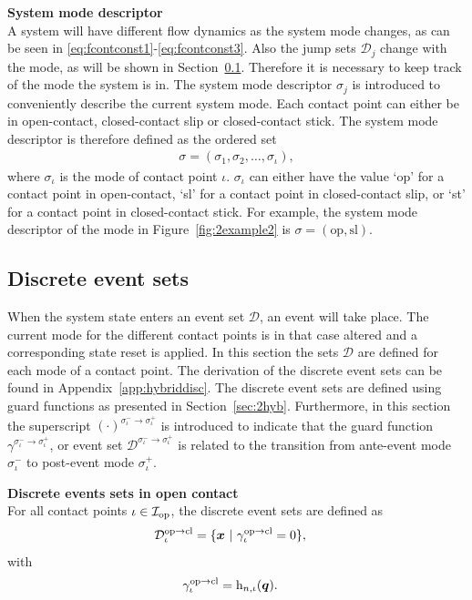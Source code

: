 \documentclass[../DC2017114Bouma.tex]{subfiles}
\begin{document}
\textbf{System mode descriptor}\\
A system will have different flow dynamics as the system mode changes, as can be seen in \eqref{eq:fcontconst1}-\eqref{eq:fcontconst3}. Also the jump sets $\mathcal{D}_j$ change with the mode, as will be shown in Section~\ref{sec:2event}. Therefore it is necessary to keep track of the mode the system is in. The system mode descriptor $\sigma_j$ is introduced to conveniently describe the current system mode. Each contact point can either be in open-contact, closed-contact slip or closed-contact stick. The system mode descriptor is therefore defined as the ordered set
\begin{align}
\sigma = (\sigma_1,\sigma_2,\dots,\sigma_\iota),
\end{align}
where $\sigma_\iota$ is the mode of contact point $\iota$. $\sigma_\iota$ can either have the value `op' for a contact point in open-contact, `sl' for a contact point in closed-contact slip, or `st' for a contact point in closed-contact stick. For example, the system mode descriptor of the mode in Figure~\ref{fig:2example2} is $\sigma = (\text{op},\text{sl})$.

\subsection{Discrete event sets}\label{sec:2event}
When the system state enters an event set $\mathcal{D}$, an event will take place. The current mode for the different contact points is in that case altered and a corresponding state reset is applied. In this section the sets $\mathcal{D}$ are defined for each mode of a contact point. The derivation of the discrete event sets can be found in Appendix~\ref{app:hybriddisc}. The discrete event sets are defined using guard functions as presented in Section~\ref{sec:2hyb}. Furthermore, in this section the superscript $(\cdot)^{\sigma_\iota^-\rightarrow\sigma_\iota^+}$ is introduced to indicate that the guard function $\gamma^{\sigma_\iota^-\rightarrow\sigma_\iota^+}$, or event set $\mathcal{D}^{\sigma_\iota^-\rightarrow\sigma_\iota^+}$ is related to the transition from ante-event mode $\sigma_\iota^-$ to post-event mode $\sigma_\iota^+$.

\textbf{Discrete events sets in open contact}\\
For all contact points $\iota\in\mathcal{I}_{\text{op}}$, the discrete event sets are defined as
\begin{align}
\mathcal{D}^{\text{op}\rightarrow\text{cl}}_{\iota} &= \{ \xb\ |\ \gamma^{\text{op}\rightarrow\text{cl}}_{\iota} = 0 \},\label{eq:2Dopcl}
\end{align}
%
with
\begin{align}
\gamma^{\text{op}\rightarrow\text{cl}}_{\iota} &= \mathrm{h}_{n,\iota}({\boldsymbol{q}}).
\end{align}
\end{document}
